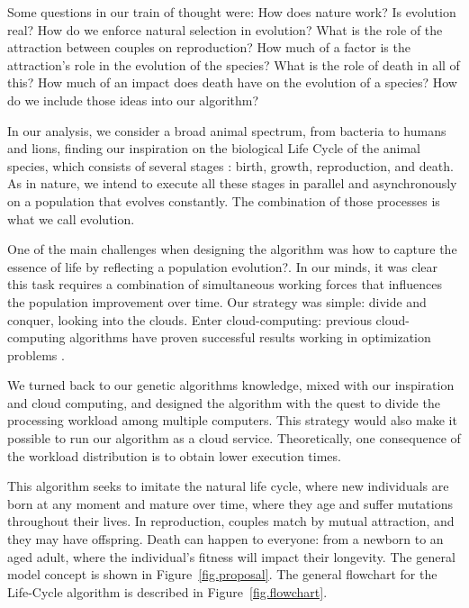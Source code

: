 \documentclass[graybox]{svmult}
\begin{document}
Some questions in our train of thought were: How does nature work? Is evolution
real? How do we enforce natural selection in evolution? What is the role of the
attraction between couples on reproduction? How much of a factor is the
attraction's role in the evolution of the species? What is the role of death in
all of this? How much of an impact does death have on the evolution of a
species? How do we include those ideas into our algorithm?

In our analysis, we consider a broad animal spectrum, from bacteria to humans
and lions, finding our inspiration on the biological Life Cycle of the animal
species, which consists of several stages \cite{read1968system}: birth, growth,
reproduction, and death. As in nature, we intend to execute all these stages in
parallel and asynchronously on a population that evolves constantly. The
combination of those processes is what we call evolution.

One of the main challenges when designing the algorithm was how to capture the
essence of life by reflecting a population evolution?. In our minds, it was
clear this task requires a combination of simultaneous working forces that
influences the population improvement over time. Our strategy was simple:
divide and conquer, looking into the clouds. Enter cloud-computing: previous
cloud-computing algorithms have proven successful results working in
optimization problems \cite{valdez2021container,garcia2021event}.

We turned back to our genetic algorithms knowledge, mixed with our inspiration
and cloud computing, and designed the algorithm with the quest to divide the
processing workload among multiple computers. This strategy would also make it
possible to run our algorithm as a cloud service. Theoretically, one
consequence of the workload distribution is to obtain lower execution times.

This algorithm seeks to imitate the natural life cycle, where new individuals
are born at any moment and mature over time, where they age and suffer
mutations throughout their lives. In reproduction, couples match by mutual
attraction, and they may have offspring. Death can happen to everyone: from a
newborn to an aged adult, where the individual's fitness will impact their
longevity. The general model concept is shown in Figure~\ref{fig.proposal}. The general
flowchart for the Life-Cycle algorithm is described in Figure~\ref{fig.flowchart}.
\end{document}

